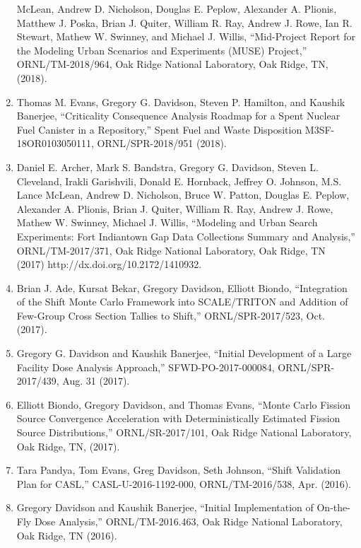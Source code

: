 \documentclass[letterpaper,11pt]{article}
\begin{document}
\begin{enumerate}
    McLean, Andrew D. Nicholson, Douglas E. Peplow, Alexander
    A. Plionis, Matthew J. Poska, Brian J. Quiter, William R. Ray,
    Andrew J. Rowe, Ian R. Stewart, Mathew W. Swinney, and Michael
    J. Willis, ``Mid-Project Report for the Modeling Urban Scenarios and
    Experiments (MUSE) Project,'' ORNL/TM-2018/964, Oak Ridge National
    Laboratory, Oak Ridge, TN, (2018).
  \item Thomas M. Evans, Gregory G. Davidson, Steven P. Hamilton,
    and Kaushik Banerjee, ``Criticality Consequence Analysis Roadmap
    for a Spent Nuclear Fuel Canister in a Repository,'' Spent Fuel
    and Waste Disposition M3SF-18OR0103050111, ORNL/SPR-2018/951
    (2018). 
  \item Daniel E. Archer, Mark S. Bandstra, Gregory G. Davidson,
    Steven L. Cleveland, Irakli Garishvili, Donald E. Hornback,
    Jeffrey O. Johnson, M.S. Lance McLean, Andrew D. Nicholson, Bruce
    W. Patton, Douglas E. Peplow, Alexander A. Plionis, Brian
    J. Quiter, William R. Ray, Andrew J. Rowe, Mathew W. Swinney,
    Michael J. Willis, ``Modeling and Urban Search Experiments: Fort
    Indiantown Gap Data Collections Summary and Analysis,''
    ORNL/TM-2017/371, Oak Ridge National Laboratory, Oak Ridge, TN
    (2017) http://dx.doi.org/10.2172/1410932.
  \item Brian J. Ade, Kursat Bekar, Gregory Davidson, Elliott
    Biondo, ``Integration of the Shift Monte Carlo Framework into
    SCALE/TRITON and Addition of Few-Group Cross Section Tallies to
    Shift,'' ORNL/SPR-2017/523, Oct. (2017).
  \item Gregory G. Davidson and Kaushik Banerjee, ``Initial
    Development of a Large Facility Dose Analysis Approach,''
    SFWD-PO-2017-000084, ORNL/SPR-2017/439, Aug. 31 (2017).
  \item Elliott Biondo, Gregory Davidson, and Thomas Evans, ``Monte
    Carlo Fission Source Convergence Acceleration with
    Deterministically Estimated Fission Source Distributions,''
    ORNL/SR-2017/101, Oak Ridge National Laboratory, Oak Ridge, TN,
    (2017).
  \item Tara Pandya, Tom Evans, Greg Davidson, Seth Johnson, ``Shift
    Validation Plan for CASL,'' CASL-U-2016-1192-000,
    ORNL/TM-2016/538, Apr. (2016).
  \item Gregory Davidson and Kaushik Banerjee, ``Initial
    Implementation of On-the-Fly Dose Analysis,'' ORNL/TM-2016.463,
    Oak Ridge National Laboratory, Oak Ridge, TN (2016).
\end{enumerate}
\end{document}

